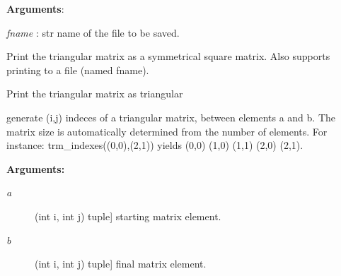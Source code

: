 \documentclass[letterpaper,10pt,english]{sphinxmanual}
\begin{document}
\begin{fulllineitems}
\begin{fulllineitems}
\textbf{Arguments}:

\emph{fname} : str
name of the file to be saved.

\end{fulllineitems}


\begin{fulllineitems}
\label{index:encore.utils.TriangularMatrix.square_print}
Print the triangular matrix as a symmetrical square matrix.
Also supports printing to a file (named fname).

\end{fulllineitems}


\begin{fulllineitems}
\label{index:encore.utils.TriangularMatrix.trm_print}
Print the triangular matrix as triangular

\end{fulllineitems}


\end{fulllineitems}


\begin{fulllineitems}
\label{index:encore.utils.trm_indeces}
generate (i,j) indeces of a triangular matrix, between elements a and b. The matrix size is automatically determined from the number of elements.
For instance: trm\_indexes((0,0),(2,1)) yields (0,0) (1,0) (1,1) (2,0) (2,1).

\textbf{Arguments:}
\begin{description}
\item[{\emph{a}}] \leavevmode{[}(int i, int j) tuple{]}
starting matrix element.

\item[{\emph{b}}] \leavevmode{[}(int i, int j) tuple{]}
final matrix element.

\end{description}

\end{fulllineitems}
\end{document}
